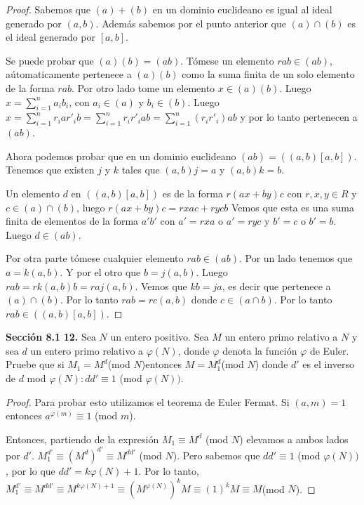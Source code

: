 \documentclass[letter,twoside,12pt]{article}
\begin{document}
\begin{enumerate}[label=\textbf{(\alph*)}]
\begin{proof}
Sabemos que $ (a) + (b) $ en un dominio euclideano es igual al ideal generado por $ (a,b) $. Adem\'as sabemos por el punto anterior que $ (a) \cap (b) $ es el ideal generado por $ [a,b] $.

Se puede probar que $(a)(b)=(ab)$. T\'omese un elemento $rab \in (ab)$, a\'utomaticamente pertenece a $(a)(b)$ como la suma finita de un solo elemento de la forma $ rab $. Por otro lado tome un elemento $x \in (a)(b)$. Luego $x = \sum_{i=1}^n a_ib_i$, con $a_i \in (a)$ y $ b_i \in (b) $. Luego $ x = \sum_{i=1}^{n} r_iar'_ib= \sum_{i=1}^{n} r_ir'_iab=\sum_{i=1}^{n} (r_ir'_i)ab$ y por lo tanto pertenecen a $(ab)$.

Ahora podemos probar que en un dominio euclideano $ (ab) =((a,b)[a,b])$. Tenemos que existen $j$ y $ k $ tales que $ (a,b)j=a $ y $ (a,b)k=b $.

Un elemento $d$ en $ ((a,b)[a,b]) $ es de la forma $r(ax+by)c$ con $r,x,y \in R$ y $c \in (a) \cap (b)$, luego $r(ax+by)c=rxac+rycb$ Vemos que esta es una suma finita de elementos de la forma $a'b'$ con $ a'=rxa $ o $ a' = ryc $ y $b'=c$ o $b' = b$. Luego $d \in (ab)$.

Por otra parte t\'omese cualquier elemento $rab \in (ab)$. Por un lado tenemos que $ a=k(a,b) $. Y por el otro que $b=j(a,b)$. Luego $ rab = rk(a,b)b = raj(a,b) $. Vemos que $kb=ja$, es decir que pertenece a $(a) \cap (b)$. Por lo tanto $rab=rc(a,b)$ donde $c \in (a \cap b)$. Por lo tanto $rab \in ((a,b)[a,b])$. 
 \end{proof}
\end{enumerate}
\newpage
\textbf{Secci\'on 8.1} \textbf{12.} Sea $N$ un entero positivo. Sea $ M $ un entero primo relativo a $ N $ y sea $ d $ un entero primo relativo a $ \varphi(N) $, donde $ \varphi $ denota la funci\'on $ \varphi $ de Euler. Pruebe que si $ M_1 = M^d $(mod $ N $)entonces $ M = M_1^d $(mod $ N $) donde $ d' $ es el inverso de $ d $ mod $ \varphi(N): dd'\equiv 1$ (mod $ \varphi(N) )$.

\begin{proof}
Para probar esto utilizamos el teorema de Euler Fermat. Si $(a,m)=1$ entonces $a^{\varphi(m)}\equiv 1$ (mod $m$).

Entonces, partiendo de la expresi\'on $M_1 \equiv M^d$ (mod $N$) elevamos a ambos lados por $d'$. $M_1^{d'} \equiv (M^{d})^{d'} \equiv M^{dd'}$ (mod $N$). Pero sabemos que $dd'\equiv 1$ (mod $ \varphi(N) )$, por lo que $dd'=k\varphi(N)+1$. Por lo tanto, $M_1^{d'}\equiv M^{dd'}\equiv M^{k\varphi(N)+1} \equiv (M^{\varphi(N)})^kM \equiv (1)^kM \equiv M $(mod $N$).


\end{proof}
\end{document}
